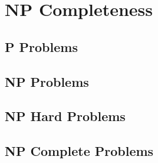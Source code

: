 \chapter{NP Completeness}

\section{P Problems}

\section{NP Problems}

\section{NP Hard Problems}

\section{NP Complete Problems}
